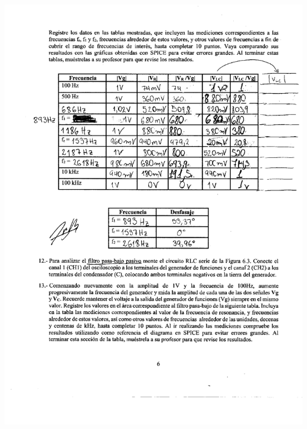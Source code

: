 \documentclass[12pt]{article}
\begin{document}
\begin{enumerate}
    	\begin{center}
    		\includegraphics[width=16cm,height=20cm]{Img/prac_0003}
    	\end{center}
    	

\end{enumerate}
\end{document}
